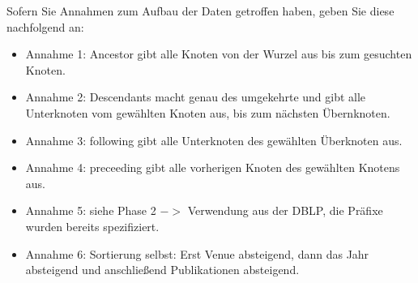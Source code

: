\documentclass[11pt]{scrartcl}
\begin{document}
Sofern Sie Annahmen zum Aufbau der Daten getroffen haben, geben Sie diese nachfolgend an:
\begin{itemize}
	\item Annahme 1: Ancestor gibt alle Knoten von der Wurzel aus bis zum gesuchten Knoten.
    \item Annahme 2: Descendants macht genau des umgekehrte und gibt alle Unterknoten vom gewählten Knoten aus, bis zum nächsten Übernknoten.
    \item Annahme 3: following gibt alle Unterknoten des gewählten Überknoten aus.
    \item Annahme 4: preceeding gibt alle vorherigen Knoten des gewählten Knotens aus.
    \item Annahme 5: siehe Phase 2 $->$ Verwendung aus der DBLP, die Präfixe wurden bereits spezifiziert.
    \item Annahme 6: Sortierung selbst: Erst Venue absteigend, dann das Jahr absteigend und anschließend Publikationen absteigend.
\end{itemize}
\end{document}
